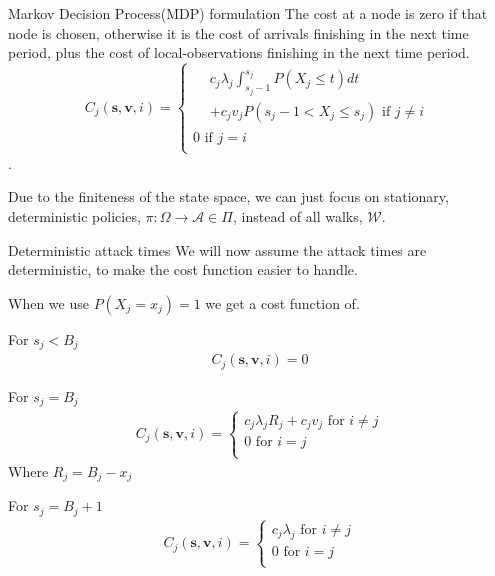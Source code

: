 \documentclass[10pt]{beamer}
\begin{document}
\begin{frame}{Markov Decision Process(MDP) formulation}
The cost at a node is zero if that node is chosen, otherwise it is the cost of arrivals finishing in the next time period, plus the cost of local-observations finishing in the next time period.
\
$$C_{j}(\bm{s},\bm{v},i)=\begin{cases}
\begin{split}
&c_{j} \lambda_{j} \int_{s_{j}-1}^{s_{j}} P(X_{j} \leq t) dt \\
&+ c_{j}v_{j}P(s_{j}-1 < X_{j} \leq s_{j}) \text{ if } j \neq i 
\end{split} \\
0 \text{ if } j=i \\
\end{cases}$$.

Due to the finiteness of the state space, we can just focus on stationary, deterministic policies, $\pi: \Omega \rightarrow \mathcal{A} \in \Pi$, instead of all walks, $\mathcal{W}$.
\end{frame}

\begin{frame}{Deterministic attack times}
We will now assume the attack times are deterministic, to make the cost function easier to handle.

When we use $P(X_{j}=x_{j})=1$ we get a cost function of.

For $s_{j} < B_{j}$
\begin{align*}
C_{j}(\bm{s},\bm{v},i)=0
\end{align*}

For $s_{j}=B_{j}$
\begin{align*}
C_{j}(\bm{s},\bm{v},i)= \begin{cases}
c_{j} \lambda_{j} R_{j} + c_{j} v_{j}  \text{ for } i \neq j \\ 
0 \text{ for } i=j \\
\end{cases}  
\end{align*}
Where $R_{j}=B_{j}-x_{j}$

For $s_{j}=B_{j}+1$
\begin{align*}
C_{j}(\bm{s},\bm{v},i)= \begin{cases}
c_{j} \lambda_{j} \text{ for } i \neq j \\
0 \text{ for } i=j \\
\end{cases}
\end{align*}

\end{frame}
\end{document}
